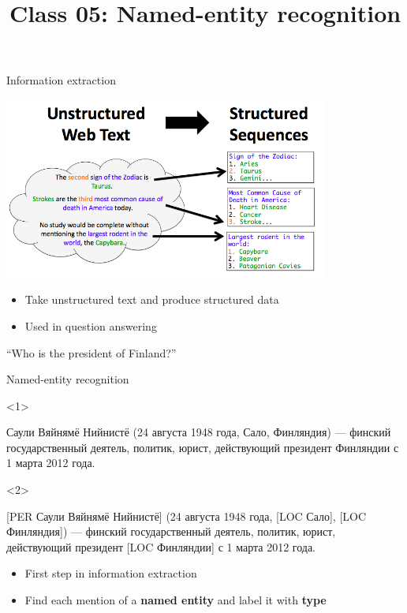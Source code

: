 \documentclass[10pt, compress]{beamer}
\title{Class 05: Named-entity recognition}
\begin{document}
\maketitle

\begin{frame}{Information extraction}

\begin{center}
\includegraphics[width=0.8\textwidth]{graphics/inform-extract.png}
\end{center}


\begin{itemize}
  \item Take unstructured text and produce structured data
  \item Used in question answering 
\end{itemize}

\begin{center}
``Who is the president of Finland?''
\end{center}

\end{frame}


\begin{frame}{Named-entity recognition}

\begin{onlyenv}<1>
\begin{framed}
Саули Вяйнямё Нийнистё (24 августа 1948 года, Сало, Финляндия) — финский 
государственный деятель, политик, юрист, действующий президент Финляндии с 1 марта 2012 года. 
\end{framed}
\end{onlyenv}
\begin{onlyenv}<2>
\begin{framed}
\alert<2>{[PER Саули Вяйнямё Нийнистё]} (24 августа 1948 года, \alert<2>{[LOC Сало], [LOC Финляндия]}) — финский 
государственный деятель, политик, юрист, действующий президент \alert<2>{[LOC Финляндии]} с 1 марта 2012 года. 
\end{framed}
\end{onlyenv}

\begin{itemize}
  \item First step in information extraction
  \item Find each mention of a \textbf{named entity} and label it with \textbf{type}
\end{itemize}


\end{frame}
\end{document}
